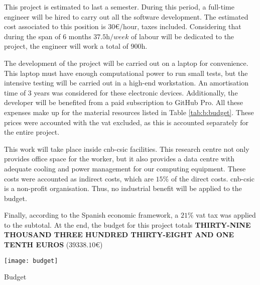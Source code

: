 \documentclass[../main.tex]{subfiles}
\begin{document}
This project is estimated to last a semester. During this period, a full-time engineer will be hired to carry out all the software development. The estimated cost associated to this position is $30$\euro/hour, taxes included. Considering that during the span of 6 months $37.5 \si{\hour/week}$ of labour will be dedicated to the project, the engineer will work a total of $900 \si{\hour}$.

The development of the project will be carried out on a laptop for convenience. This laptop must have enough computational power to run small tests, but the intensive testing will be carried out in a high-end workstation. An amortisation time of 3 years was considered for these electronic devices. Additionally, the developer will be benefited from a paid subscription to GitHub Pro. All these expenses make up for the material resources listed in Table \ref{tab:b:budget}. These prices were accounted with the \gls{vat} excluded, as this is accounted separately for the entire project.

This work will take place inside \gls{cnb}-\gls{csic} facilities. This research centre not only provides office space for the worker, but it also provides a data centre with adequate cooling and power management for our computing equipment. These costs were accounted as indirect costs, which are $15 \si{\percent}$ of the direct costs. \Gls{cnb}-\gls{csic} is a non-profit organisation. Thus, no industrial benefit will be applied to the budget.

Finally, according to the Spanish economic framework, a $21 \si{\percent}$ \gls{vat} tax was applied to the subtotal. At the end, the budget for this project totals \textbf{THIRTY-NINE THOUSAND THREE HUNDRED THIRTY-EIGHT AND ONE TENTH EUROS} ($39338.10$\euro)

\begin{table}[htbp]
    \centering
    \texttt{[image: budget]}
    \caption{Budget}
    \label{tab:b:budget}
\end{table}
\end{document}
